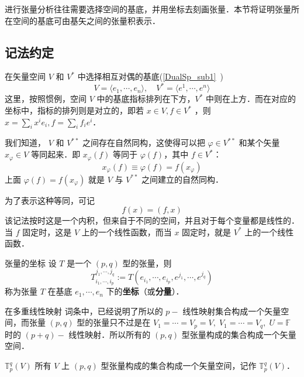
进行张量分析往往需要选择空间的基底，并用坐标去刻画张量．本节将证明张量所在空间的基底可由基矢之间的张量积表示．
\subsection{记法约定}
在矢量空间 $V$ 和 $V^*$ 中选择相互对偶的基底(\autoref{DualSp_sub1}~)
\begin{equation}
V=\langle e_1,\cdots ,e_n\rangle,\quad V^*=\langle e^1,\cdots,e^n\rangle
\end{equation}
这里，按照惯例，空间 $V$ 中的基底指标排列在下方，$V^*$ 中则在上方．而在对应的坐标中，指标的排列则是对立的，即若 $x\in V,f\in V^*$ ，则 $x=\sum_{i}x^i e_i,f=\sum_{i}f_ie^i$．

我们知道， $V$ 和 $V^{**}$ 之间存在自然同构，这使得可以把 $\varphi\in V^{**}$ 和某个矢量 $x_{\varphi}\in V$ 等同起来．即 $x_{\varphi}(f)$ 等同于 $\varphi(f)$，其中 $f\in V^*$：
\begin{equation}
x_{\varphi}(f)\equiv\varphi(f)=f(x_{\varphi})
\end{equation}
上面 $\varphi(f)=f(x_{\varphi})$ 就是 $V$ 与 $V^{**}$ 之间建立的自然同构．

为了表示这种等同，可记
\begin{equation}
f(x)=(f,x)
\end{equation}
该记法按时这是一个内积，但来自于不同的空间，并且对于每个变量都是线性的．当 $f$ 固定时，这是 $V$ 上的一个线性函数，而当 $x$ 固定时，就是 $V^{*}$ 上的一个线性函数．
\begin{definition}{张量的坐标}
设 $T$ 是一个 $(p,q)$ 型的张量，则
\begin{equation}
T^{j_1,\cdots,j_q}_{i_1,\cdots,i_p}:=T(e_{i_1},\cdots,e_{i_p},e^{j_1},\cdots,e^{j_q})
\end{equation}
称为张量 $T$ 在基底 ${e_1,\cdots,e_n}$ 下的\textbf{坐标}（或\textbf{分量}）．
\end{definition}

在多重线性映射 词条中，已经说明了所以的 $p-$ 线性映射集合构成一个矢量空间，而张量 $(p,q)$ 型的张量只不过是在 $V_1=\cdots=V_p=V,\;V_1=\cdots=V_q,\;U=\mathbb F$ 时的 $(p+q)-$ 线性映射．所以所有的 $(p,q)$ 型张量构成的集合构成一个矢量空间．
\begin{definition}{$\mathbb T^q_p(V)$}
所有 $V$ 上 $(p,q)$ 型张量构成的集合构成一个矢量空间，记作 $\mathbb T^q_p(V)$．
\end{definition} 
